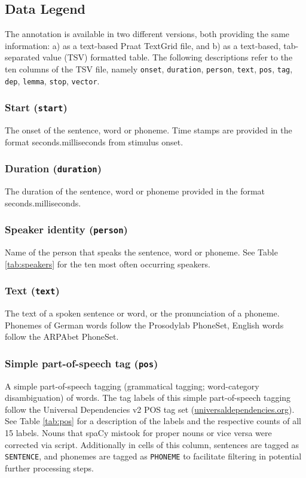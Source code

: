 \documentclass[10pt,a4paper,onecolumn]{article}
\begin{document}
\subsection*{Data Legend}
The annotation is available in two different versions, both providing the same
information: a) as a text-based Praat TextGrid file, and b) as a text-based,
tab-separated value (TSV) formatted table.
The following descriptions refer to the ten columns of the TSV file, namely
\texttt{onset}, \texttt{duration}, \texttt{person}, \texttt{text}, \texttt{pos}, \texttt{tag}, \texttt{dep}, \texttt{lemma},
\texttt{stop}, \texttt{vector}.


\subsubsection*{Start (\texttt{start})} The onset of the sentence, word or
phoneme. Time stamps are provided in the format seconds.milliseconds from stimulus
onset.


\subsubsection*{Duration (\texttt{duration})} The duration of the sentence,
word or phoneme provided in the format seconds.milliseconds.


\subsubsection*{Speaker identity (\texttt{person})} Name of the person that
speaks the sentence, word or phoneme. See Table \ref{tab:speakers} for the ten
most often occurring speakers.


\subsubsection*{Text (\texttt{text})}
The text of a spoken sentence or word, or the pronunciation of a phoneme.
Phonemes of German words follow the Prosodylab PhoneSet, English words follow
the ARPAbet PhoneSet.


\subsubsection*{Simple part-of-speech tag (\texttt{pos})} A simple
part-of-speech tagging (grammatical tagging; word-category disambiguation) of
words.
The tag labels of this simple part-of-speech tagging follow the Universal
Dependencies v2 POS tag set
(\href{https://universaldependencies.org}{universaldependencies.org}).
See Table \ref{tab:pos} for a description of the labels and the respective
counts of all 15 labels. Nouns that spaCy mistook for proper nouns or vice versa
were corrected via script.
Additionally in cells of this column, sentences are tagged as \texttt{SENTENCE},
and phonemes are tagged as \texttt{PHONEME} to facilitate filtering in potential
further processing steps.
\end{document}
